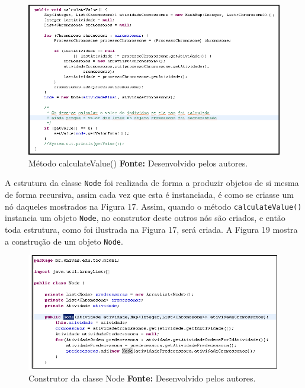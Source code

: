 \begin{figure}[h!]
	\centerline{\includegraphics[scale=0.6]{./imagens/codigo_calculate_value.png}}
	\caption[Método calculateValue()]
	{Método calculateValue() \textbf{Fonte:} Desenvolvido pelos autores.}
	\label{fig:exemplo1}
\end{figure}

\par A estrutura da classe \texttt{Node} foi realizada de forma a produzir objetos de si mesma de forma recursiva, assim 
cada vez que esta é instanciada, é como se criasse um nó daqueles
mostrados na Figura 17.
Assim, quando o método \texttt{calculateValue()} instancia um objeto
\texttt{Node}, no construtor deste outros nós são criados, e então toda
estrutura, como foi ilustrada na Figura 17, será criada.
A Figura 19 mostra a construção de um objeto \texttt{Node}. 

\begin{figure}[h!]
	\centerline{\includegraphics[scale=0.8]{./imagens/node_class.png}}
	\caption[Construtor da classe Node]
	{Construtor da classe Node \textbf{Fonte:} Desenvolvido pelos autores.}
	\label{fig:exemplo1}
\end{figure}


